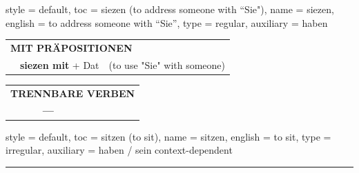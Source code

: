 \begin{verbentry}{
  style = {default},
  toc = {siezen (to address someone with ``Sie")},
  name = {siezen},
  english = {to address someone with \enquote{Sie}},
  type = {regular},
  auxiliary = {haben}
}
\vspace{10pt}

\begin{tabular}{lll}
\multicolumn{3}{l}{\textbf{MIT PRÄPOSITIONEN}}\\
& \textbf{siezen mit} + Dat & (to use "Sie" with someone)\\
\end{tabular}
\hfill
\begin{tabular}{lll}
\multicolumn{3}{l}{\textbf{TRENNBARE VERBEN}}\\
& \textbf{---} & \\
\end{tabular}
\vspace{-5pt}
\end{verbentry}

\begin{verbentry}{
  style = {default},
  toc = {sitzen (to sit)},
  name = {sitzen},
  english = {to sit},
  type = {irregular},
  auxiliary = {haben / sein context-dependent}
}
 
    
     \vspace{5pt}

    \hrule
    
    \vspace{5pt}


\end{verbentry}
